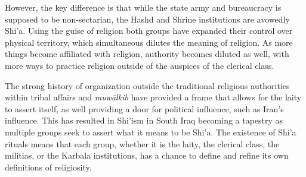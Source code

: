 However, the key difference is that while the state army and bureaucracy is supposed to be non-sectarian, the Hashd and Shrine institutions are avowedly Shi'a. Using the guise of religion both groups have expanded their control over physical territory, which simultaneous dilutes the meaning of religion. As more things become affiliated with religion, authority becomes diluted as well, with more ways to practice religion outside of the auspices of the clerical class. 

The strong history of organization outside the traditional religious authorities within tribal affairs and \emph{muwālkib} have provided a frame that allows for the laity to assert itself, as well providing a door for political influence, such as Iran's influence. This has resulted in Shi'ism in South Iraq becoming a tapestry as multiple groups seek to assert what it means to be Shi'a. The existence of Shi'a rituals means that each group, whether it is the laity, the clerical class, the militias, or the Karbala institutions, has a chance to define and refine its own definitions of religiosity. 


